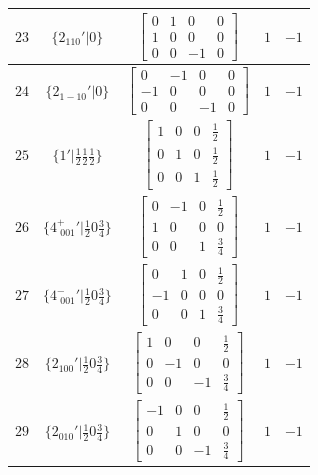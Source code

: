 \documentclass[fleqn,8pt]{jsarticle}
\begin{document}
\begin{longtable}{ccccc}
$ 23 $ & $ \{2{}_{110}{}'|0\} $ & $ \begin{bmatrix} 0 & 1 & 0 & 0 \\ 1 & 0 & 0 & 0 \\ 0 & 0 & -1 & 0 \end{bmatrix} $ & $ 1 $ & $ -1 $ \\ \hline
$ 24 $ & $ \{2{}_{1-10}{}'|0\} $ & $ \begin{bmatrix} 0 & -1 & 0 & 0 \\ -1 & 0 & 0 & 0 \\ 0 & 0 & -1 & 0 \end{bmatrix} $ & $ 1 $ & $ -1 $ \\ \hline
$ 25 $ & $ \{1{}'|\frac{1}{2} \frac{1}{2} \frac{1}{2}\} $ & $ \begin{bmatrix} 1 & 0 & 0 & \frac{1}{2} \\ 0 & 1 & 0 & \frac{1}{2} \\ 0 & 0 & 1 & \frac{1}{2} \end{bmatrix} $ & $ 1 $ & $ -1 $ \\ \hline
$ 26 $ & $ \{4^{+}_{\,\,001}{}'|\frac{1}{2} 0 \frac{3}{4}\} $ & $ \begin{bmatrix} 0 & -1 & 0 & \frac{1}{2} \\ 1 & 0 & 0 & 0 \\ 0 & 0 & 1 & \frac{3}{4} \end{bmatrix} $ & $ 1 $ & $ -1 $ \\ \hline
$ 27 $ & $ \{4^{-}_{\,\,001}{}'|\frac{1}{2} 0 \frac{3}{4}\} $ & $ \begin{bmatrix} 0 & 1 & 0 & \frac{1}{2} \\ -1 & 0 & 0 & 0 \\ 0 & 0 & 1 & \frac{3}{4} \end{bmatrix} $ & $ 1 $ & $ -1 $ \\ \hline
$ 28 $ & $ \{2{}_{100}{}'|\frac{1}{2} 0 \frac{3}{4}\} $ & $ \begin{bmatrix} 1 & 0 & 0 & \frac{1}{2} \\ 0 & -1 & 0 & 0 \\ 0 & 0 & -1 & \frac{3}{4} \end{bmatrix} $ & $ 1 $ & $ -1 $ \\ \hline
$ 29 $ & $ \{2{}_{010}{}'|\frac{1}{2} 0 \frac{3}{4}\} $ & $ \begin{bmatrix} -1 & 0 & 0 & \frac{1}{2} \\ 0 & 1 & 0 & 0 \\ 0 & 0 & -1 & \frac{3}{4} \end{bmatrix} $ & $ 1 $ & $ -1 $ \\ \hline

\end{longtable}
\end{document}
